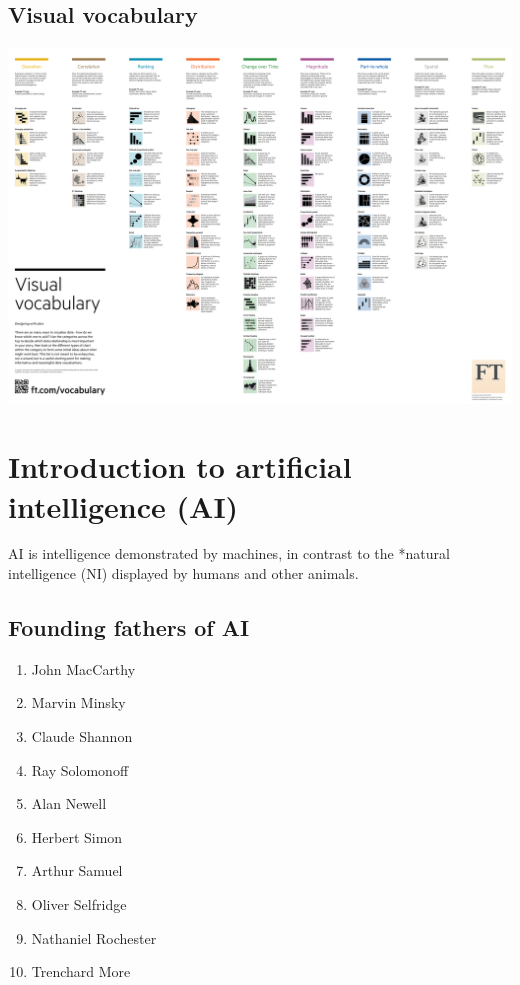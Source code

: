 \documentclass[11pt]{article}
\begin{document}
\subsection{Visual vocabulary}
\label{sec:org9a96f2f}
\begin{center}
\includegraphics[width=.9\linewidth]{./images/visual-vocabulary.png}
\end{center}

 \newpage
\section{Introduction to artificial intelligence (AI)}
\label{sec:org23fcf09}
AI is intelligence demonstrated by machines, in contrast to the *natural intelligence (NI) displayed by humans and other animals.
\subsection{Founding fathers of AI}
\label{sec:orgb4827e7}
\begin{enumerate}
\item John MacCarthy
\item Marvin Minsky
\item Claude Shannon
\item Ray Solomonoff
\item Alan Newell
\item Herbert Simon
\item Arthur Samuel
\item Oliver Selfridge
\item Nathaniel Rochester
\item Trenchard More
\end{enumerate}
\end{document}
